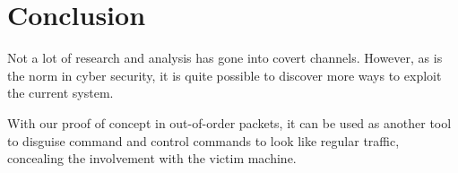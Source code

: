 \documentclass[letterpaper,twocolumn,10pt]{article}
\begin{document}
\section{Conclusion}

Not a lot of research and analysis has gone into covert channels. However, as is the norm in cyber security, it is quite possible to discover more ways to exploit the current system.

With our proof of concept in out-of-order packets, it can be used as another tool to disguise command and control commands to look like regular traffic, concealing the involvement with the victim machine.




\def\UrlBreaks{\do\/\do-}

\end{document}
